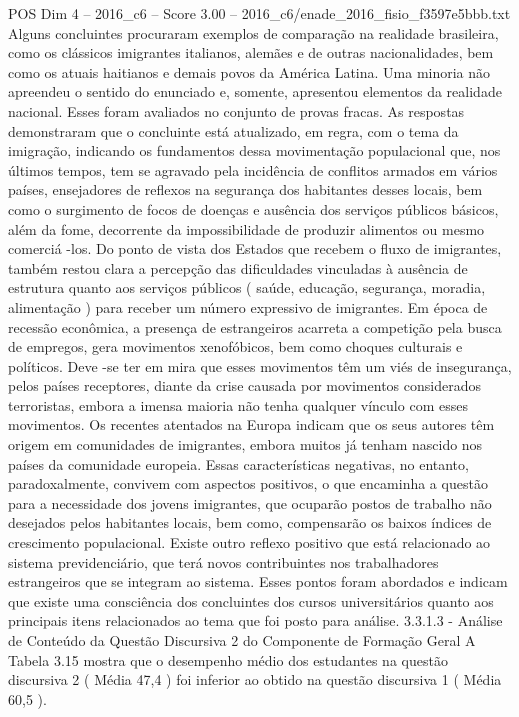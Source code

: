 \begin{textsample}{POS Dim 4 – 2016\_c6 – Score 3.00 – 2016\_c6/enade\_2016\_fisio\_f3597e5bbb.txt}
Alguns concluintes procuraram exemplos de comparação na realidade brasileira, como os clássicos imigrantes italianos, alemães e de outras nacionalidades, bem como os atuais haitianos e demais povos da América Latina.
Uma minoria não apreendeu o sentido do enunciado e, somente, apresentou elementos da realidade nacional.
Esses foram avaliados no conjunto de provas fracas.
As respostas demonstraram que o concluinte está atualizado, em regra, com o tema da imigração, indicando os fundamentos dessa movimentação populacional que, nos últimos tempos, tem se agravado pela incidência de conflitos armados em vários países, ensejadores de reflexos na segurança dos habitantes desses locais, bem como o surgimento de focos de doenças e ausência dos serviços públicos básicos, além da fome, decorrente da impossibilidade de produzir alimentos ou mesmo comerciá -los.
Do ponto de vista dos Estados que recebem o fluxo de imigrantes, também restou clara a percepção das dificuldades vinculadas à ausência de estrutura quanto aos serviços públicos ( saúde, educação, segurança, moradia, alimentação ) para receber um número expressivo de imigrantes.
Em época de recessão econômica, a presença de estrangeiros acarreta a competição pela busca de empregos, gera movimentos xenofóbicos, bem como choques culturais e políticos.
Deve -se ter em mira que esses movimentos têm um viés de insegurança, pelos países receptores, diante da crise causada por movimentos considerados terroristas, embora a imensa maioria não tenha qualquer vínculo com esses movimentos.
Os recentes atentados na Europa indicam que os seus autores têm origem em comunidades de imigrantes, embora muitos já tenham nascido nos países da comunidade europeia.
Essas características negativas, no entanto, paradoxalmente, convivem com aspectos positivos, o que encaminha a questão para a necessidade dos jovens imigrantes, que ocuparão postos de trabalho não desejados pelos habitantes locais, bem como, compensarão os baixos índices de crescimento populacional.
Existe outro reflexo positivo que está relacionado ao sistema previdenciário, que terá novos contribuintes nos trabalhadores estrangeiros que se integram ao sistema.
Esses pontos foram abordados e indicam que existe uma consciência dos concluintes dos cursos universitários quanto aos principais itens relacionados ao tema que foi posto para análise. 3.3.1.3 - Análise de Conteúdo da Questão Discursiva 2 do Componente de Formação Geral A Tabela 3.15 mostra que o desempenho médio dos estudantes na questão discursiva 2 ( Média 47,4 ) foi inferior ao obtido na questão discursiva 1 ( Média 60,5 ).

\end{textsample}
